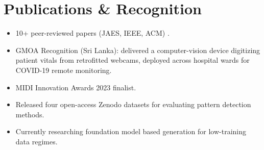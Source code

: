 \documentclass[11pt]{article}
\begin{document}
\enlargethispage{4\baselineskip}
\vspace{-0.3em}
\section*{Publications \& Recognition}
\begin{itemize}[leftmargin=1.2em, itemsep=-0.25em]
    \item 10+ peer-reviewed papers (JAES, IEEE, ACM) {}.

    

    \item {GMOA Recognition (Sri Lanka):} delivered a computer-vision device digitizing patient vitals from retrofitted webcams, deployed across hospital wards for COVID-19 remote monitoring.
    \item MIDI Innovation Awards 2023 finalist.
    
    \item Released four open-access Zenodo datasets for evaluating pattern detection methods.
    \item Currently researching foundation model based generation for low-training data regimes.
\end{itemize}
\end{document}

